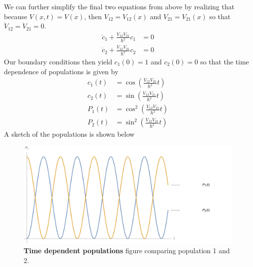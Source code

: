 \documentclass[a4paper, 11pt]{article}
\newenvironment{solution}{%
	\begin{list}{}{%
			\setlength{\topsep}{0pt}%
			\setlength{\leftmargin}{0.5cm}%
			\setlength{\rightmargin}{0.5cm}%
			\setlength{\listparindent}{\parindent}%
			\setlength{\itemindent}{\parindent}%
			\setlength{\parsep}{\parskip}%
		}%
		\item[]}{\end{list}}
\begin{document}
\begin{enumerate}[leftmargin=0em, label=\textbf{\arabic*}]
\begin{solution}
      We can further simplify the final two equations from above by realizing
      that because $V(x,t)=V(x)$, then $V_{12}=V_{12}(x)$ and $V_{21}=
      V_{21}(x)$ so that $\dot V_{12}=\dot V_{21} = 0$. \\

      \begin{align}
        \ddot c_1 + \frac{V_{12}V_{21}}{\hbar^2}c_1 &= 0 \\
        \ddot c_2 + \frac{V_{12}V_{21}}{\hbar^2}c_2 &= 0 
      \end{align}
      Our boundary conditions then yield $c_1(0)=1$ and $c_2(0)=0$ so that the
      time dependence of populations is given by
      \begin{align}
        c_1(t) &= \cos\left(\frac{V_{12}V_{21}}{\hbar^2}t\right) \\ 
        c_2(t) &= \sin\left(\frac{V_{12}V_{21}}{\hbar^2}t\right) \\ 
        P_1(t) &= \cos^2\left(\frac{V_{12}V_{21}}{\hbar^2}t\right) \\ 
        P_2(t) &= \sin^2\left(\frac{V_{12}V_{21}}{\hbar^2}t\right) 
      \end{align}
      A sketch of the populations is shown below
      \begin{figure}[!hbt]
        \centering
        \includegraphics[width=1\columnwidth]{sketch}
        \caption{\textbf{Time dependent populations} figure comparing population
        1 and 2.}
      \end{figure}
      

    \end{solution}
    


\end{enumerate}

  
\end{document}
